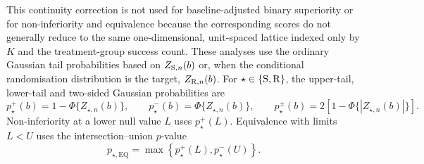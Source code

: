 \documentclass[12pt,a4paper]{article}
\theoremstyle{definition}
\theoremstyle{remark}\newtheorem{remark}{Remark}
\numberwithin{equation}{section}
\begin{document}
This continuity correction is not used for baseline-adjusted binary superiority or for non-inferiority and equivalence because the corresponding scores do not generally reduce to the same one-dimensional, unit-spaced lattice indexed only by $K$ and the treatment-group success count. These analyses use the ordinary Gaussian tail probabilities based on $Z_{{\rm S},n}(b)$ or, when the conditional randomisation distribution is the target, $Z_{{\rm R},n}(b)$. For $\star\in\{{\rm S},{\rm R}\}$, the upper-tail, lower-tail and two-sided Gaussian probabilities are
\[
p_{\star}^{+}(b)=1-\Phi\{Z_{\star,n}(b)\},
\qquad
p_{\star}^{-}(b)=\Phi\{Z_{\star,n}(b)\},
\qquad
p_{\star}^{\pm}(b)=2\left[1-\Phi\{|Z_{\star,n}(b)|\}\right].
\]
Non-inferiority at a lower null value $L$ uses $p_{\star}^{+}(L)$. Equivalence with limits $L<U$ uses the intersection--union $p$-value
\[
p_{\star,\mathrm{EQ}}
=
\max\left\{
p_{\star}^{+}(L),
p_{\star}^{-}(U)
\right\}.
\]
\end{document}
